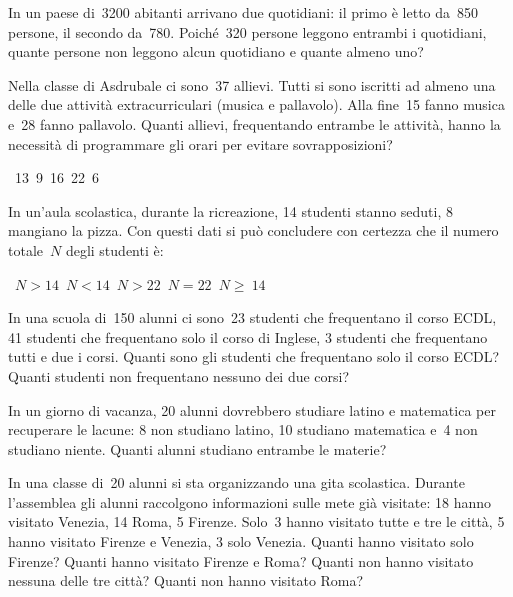\begin{multicols}{2}
\begin{esercizio}
\label{ese:7.33}
In un paese di~3200 abitanti arrivano due quotidiani: il primo è letto da~850
persone, il secondo da~780. Poiché~320 persone leggono entrambi i
quotidiani, quante persone non leggono alcun quotidiano e quante almeno uno?
\end{esercizio}

\begin{esercizio}
\label{ese:7.34}
Nella classe di Asdrubale ci sono~37 allievi. Tutti si sono iscritti
ad almeno una delle due attività extracurriculari (musica e
pallavolo). Alla fine~15 fanno musica e~28 fanno pallavolo.
Quanti allievi, frequentando entrambe le attività, hanno la
necessità di programmare gli orari per evitare sovrapposizioni?
\begin{center}
 \boxA~13\quad\boxB~9\quad\boxC~16\quad\boxD~22\quad\boxE~6
\end{center}
\end{esercizio}

\begin{esercizio}
\label{ese:7.35}
In un'aula scolastica, durante la ricreazione, 14
studenti stanno seduti, 8 mangiano la pizza. Con questi dati si può
concludere con certezza che il numero totale~\(N\) degli studenti è:
\begin{center}
 \boxA\quad~\(N>14\)\quad\boxB\quad~\(N<14\)\quad\boxC\quad~\(N>22\)\quad\boxD\quad~\(N 
= 22\)\quad\boxE\quad~\(N\geqslant~14\)
\end{center}
\end{esercizio}

\begin{esercizio}
\label{ese:7.36}
In una scuola di~150 alunni ci sono~23 studenti che frequentano il corso ECDL, 
41 studenti che frequentano solo il corso di Inglese, 3
studenti che frequentano tutti e due i corsi. Quanti sono gli studenti che 
frequentano solo il corso ECDL? Quanti studenti non frequentano
nessuno dei due corsi?
\end{esercizio}

\begin{esercizio}
\label{ese:7.37}
In un giorno di vacanza, 20 alunni dovrebbero studiare latino e
matematica per recuperare le lacune: 8 non studiano latino, 10 studiano
matematica e~4 non studiano niente. Quanti alunni studiano entrambe le
materie?
\end{esercizio}

\begin{esercizio}
\label{ese:7.38}
In una classe di~20 alunni si sta organizzando una gita
scolastica. Durante l'assemblea gli alunni raccolgono
informazioni sulle mete già visitate: 18 hanno visitato Venezia, 14
Roma, 5 Firenze. Solo~3 hanno visitato tutte e tre le città, 5 hanno
visitato Firenze e Venezia, 3 solo Venezia. Quanti hanno visitato solo
Firenze? Quanti hanno visitato Firenze e Roma? Quanti non hanno
visitato nessuna delle tre città? Quanti non hanno visitato Roma?
\end{esercizio}
\end{multicols}

